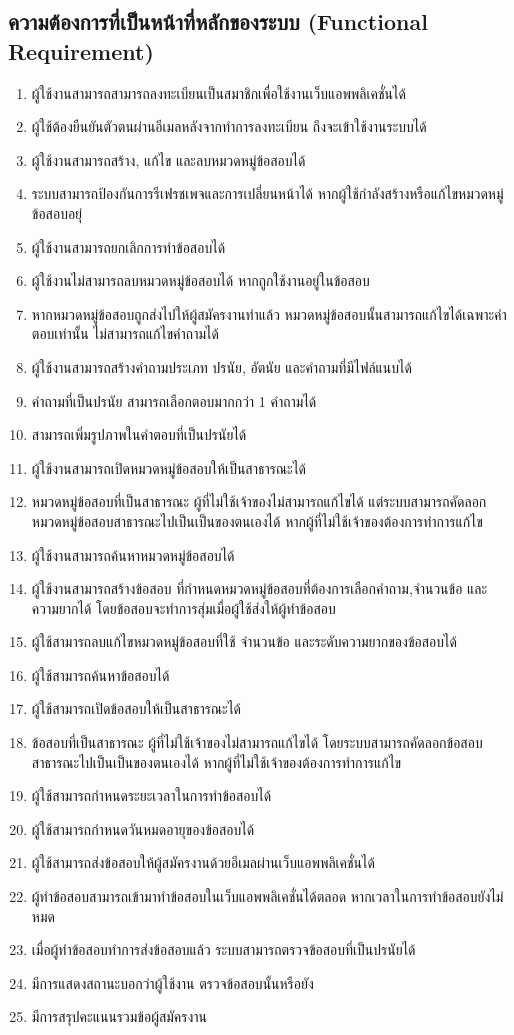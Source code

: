 \subsection{ความต้องการที่เป็นหน้าที่หลักของระบบ (Functional Requirement)}
\begin{enumerate}
  \item ผู้ใช้งานสามารถสามารถลงทะเบียนเป็นสมาชิกเพื่อใช้งานเว็บแอพพลิเคชั่นได้  
  \item ผู้ใช้ต้องยืนยันตัวตนผ่านอีเมลหลังจากทำการลงทะเบียน ถึงจะเข้าใช้งานระบบได้
  \item ผู้ใช้งานสามารถสร้าง, แก้ไข และลบหมวดหมู่ข้อสอบได้
  \item ระบบสามารถป้องกันการรีเฟรชเพจและการเปลี่ยนหน้าได้ หากผู้ใช้กำลังสร้างหรือแก้ไขหมวดหมู่ข้อสอบอยุ่
  \item ผู้ใช้งานสามารถยกเลิกการทำข้อสอบได้
  \item ผู้ใช้งานไม่สามารถลบหมวดหมู่ข้อสอบได้ หากถูกใช้งานอยู่ในข้อสอบ
  \item หากหมวดหมู่ข้อสอบถูกส่งไปให้ผู้สมัครงานทำแล้ว หมวดหมู่ข้อสอบนั้นสามารถแก้ไขได้เฉพาะคำตอบเท่านั้น ไม่สามารถแก้ไขคำถามได้
  \item ผู้ใช้งานสามารถสร้างคำถามประเภท ปรนัย, อัตนัย และคำถามที่มีไฟล์แนบได้
  \item คำถามที่เป็นปรนัย สามารถเลือกตอบมากกว่า 1 คำถามได้
  \item สามารถเพิ่มรูปภาพในคำตอบที่เป็นปรนัยได้
  \item ผู้ใช้งานสามารถเปิดหมวดหมู่ข้อสอบให้เป็นสาธารณะได้
  \item หมวดหมู่ข้อสอบที่เป็นสาธารณะ ผู้ที่ไม่ใช้เจ้าของไม่สามารถแก้ไขได้ แต่ระบบสามารถคัดลอกหมวดหมู่ข้อสอบสาธารณะไปเป็นเป็นของตนเองได้ หากผู้ที่ไม่ใช้เจ้าของต้องการทำการแก้ไข
  \item ผู้ใช้งานสามารถค้นหาหมวดหมู่ข้อสอบได้
  \item ผู้ใช้งานสามารถสร้างข้อสอบ ที่กำหนดหมวดหมู่ข้อสอบที่ต้องการเลือกคำถาม,จำนวนข้อ และความยากได้ โดยข้อสอบจะทำการสุ่มเมื่อผู้ใช้ส่งให้ผู้ทำข้อสอบ
  \item ผู้ใช้สามารถลบแก้ไขหมวดหมู่ข้อสอบที่ใช้ จำนวนข้อ และระดับความยากของข้อสอบได้
  \item ผู้ใช้สามารถค้นหาข้อสอบได้
  \item ผู้ใช้สามารถเปิดข้อสอบให้เป็นสาธารณะได้
  \item ข้อสอบที่เป็นสาธารณะ ผู้ที่ไม่ใช้เจ้าของไม่สามารถแก้ไขได้ โดยระบบสามารถคัดลอกข้อสอบสาธารณะไปเป็นเป็นของตนเองได้ หากผู้ที่ไม่ใช้เจ้าของต้องการทำการแก้ไข
  \item ผู้ใช้สามารถกำหนดระยะเวลาในการทำข้อสอบได้
  \item ผู้ใช้สามารถกำหนดวันหมดอายุของข้อสอบได้
  \item ผู้ใช้สามารถส่งข้อสอบให้ผู้สมัครงานด้วยอีเมลผ่านเว็บแอพพลิเคชั่นได้
  \item ผู้ทำข้อสอบสามารถเข้ามาทำข้อสอบในเว็บแอพพลิเคชั่นได้ตลอด หากเวลาในการทำข้อสอบยังไม่หมด
  \item เมื่อผู้ทำข้อสอบทำการส่งข้อสอบแล้ว ระบบสามารถตรวจข้อสอบที่เป็นปรนัยได้
  \item มีการแสดงสถานะบอกว่าผู้ใช้งาน ตรวจข้อสอบนั้นหรือยัง
  \item มีการสรุปคะแนนรวมข้อผู้สมัครงาน
\end{enumerate}

